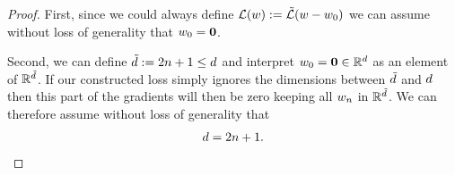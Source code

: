 \begin{proof}
	First, since we could always define
	\(\mathcal{L}(w):=\tilde{\mathcal{L}}(w-w_0)\)
	we can assume without loss of generality that \(w_0=\mathbf{0}\). 
	
	Second, we can define \(\tilde{d} := 2n +1 \le d	\)	
	and interpret \(w_0 = \mathbf{0} \in\mathbb{R}^d\) as an element of
	\(\mathbb{R}^{\tilde{d}}\). If our constructed loss simply
	ignores the dimensions between \(\tilde{d}\) and \(d\) then
	this part of the gradients will then be zero keeping all \(w_n\) in
	\(\mathbb{R}^{\tilde{d}}\). We can therefore assume without loss of
	generality that 
	\begin{align}\label{eq: w.l.o.g dim=2n+1}
		d=2n+1.
	\end{align}


\end{proof}
